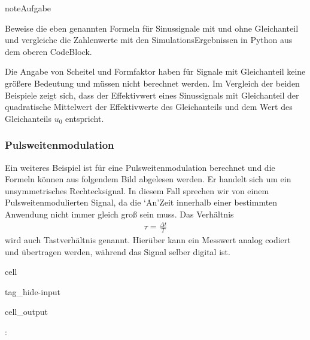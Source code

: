 \documentclass[letterpaper,10pt,english]{jupyterBook}
\begin{document}
\begin{sphinxadmonition}{note}{Aufgabe}

\sphinxAtStartPar
Beweise die eben genannten Formeln für Sinussignale mit und ohne Gleichanteil und vergleiche die Zahlenwerte mit den Simulations\sphinxhyphen{}Ergebnissen in Python aus dem oberen Code\sphinxhyphen{}Block.
\end{sphinxadmonition}

\sphinxAtStartPar
Die Angabe von Scheitel\sphinxhyphen{} und Formfaktor haben für Signale mit Gleichanteil keine größere Bedeutung und müssen nicht berechnet werden. Im Vergleich der beiden Beispiele zeigt sich, dass der Effektivwert eines Sinussignals mit Gleichanteil der quadratische Mittelwert der Effektivwerte des Gleichanteils und dem Wert des Gleichanteils \(u_0\) entspricht.


\subsubsection{Pulsweitenmodulation}
\label{\detokenize{content/3_Kenngroessen:pulsweitenmodulation}}
\sphinxAtStartPar
Ein weiteres Beispiel ist für eine Pulsweitenmodulation berechnet und die Formeln können aus folgendem Bild abgelesen werden. Er handelt sich um ein unsymmetrisches Rechtecksignal. In diesem Fall sprechen wir von einem Pulsweitenmodulierten Signal, da die ‘An’\sphinxhyphen{}Zeit innerhalb einer bestimmten Anwendung nicht immer gleich groß sein muss. Das Verhältnis
\begin{equation*}
\begin{split}\tau = \frac{\Delta t}{T}\end{split}
\end{equation*}
\sphinxAtStartPar
wird auch Tastverhältnis genannt. Hierüber kann ein Messwert analog codiert und übertragen werden, während das Signal selber digital ist.

\begin{sphinxuseclass}{cell}
\begin{sphinxuseclass}{tag_hide-input}\begin{sphinxVerbatimOutput}

\begin{sphinxuseclass}{cell_output}
\noindent{}

\end{sphinxuseclass}\end{sphinxVerbatimOutput}

\end{sphinxuseclass}
\end{sphinxuseclass}
\sphinxAtStartPar
{}:
\end{document}
